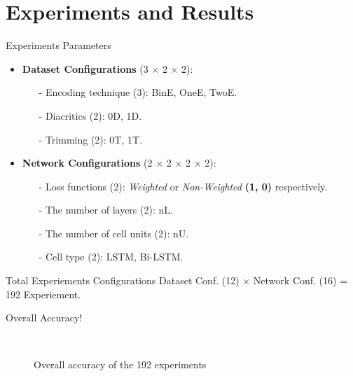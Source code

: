 \section{Experiments and Results}

\begin{frame}[fragile]{Experiments Parameters}
\begin{itemize}
	\item \textbf{Dataset Configurations} (3 $\times$ 2 $\times$ 2):
	\begin{itemize}
		\item [-] Encoding technique (3): BinE, OneE, TwoE.
		\item [-] Diacritics (2): 0D, 1D.
		\item [-] Trimming (2): 0T, 1T.
	\end{itemize}
\item \textbf{Network Configurations} (2 $\times$ 2 $\times$ 2 $\times$ 2):
\begin{itemize}
\item [-] Loss functions (2): \textit{Weighted} or \textit{Non-Weighted } \textbf{(1, 0)} respectively.
\item [-] The number of layers (2): nL.
\item [-] The number of cell units (2): nU.
\item [-] Cell type (2): LSTM, Bi-LSTM.
\end{itemize}
\end{itemize}
\begin{block}{Total Experiements Configurations}
	Dataset Conf. (12) $\times$ Network Conf. (16) = 192 Experiement.
\end{block}
\end{frame}
\begin{frame}[fragile]{Overall Accuracy!}


\begin{figure}[!t]
	
	\caption{Overall accuracy of the 192 experiments}~\label{Fig:ArabicModelsResults}
\end{figure}

\end{frame}

